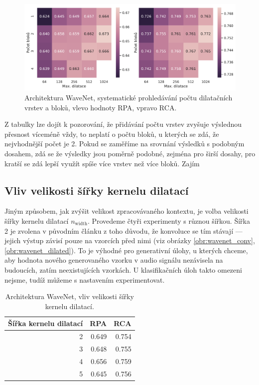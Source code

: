 \begin{figure}[h]\centering
    \includegraphics[scale=0.5]{../img/figures/wavenet_stacks_gridsearch.pdf}
\caption{Architektura WaveNet, systematické prohledávání počtu dilatačních vrstev a bloků, vlevo hodnoty RPA, vpravo RCA.}\label{obr:wavenet_stacks_gridsearch}
\end{figure}

Z tabulky lze dojít k pozorování, že přidávání počtu vrstev zvyšuje výslednou přesnost víceméně vždy, to neplatí o počtu bloků, u kterých se zdá, že nejvhodnější počet je 2. Pokud se zaměříme na srovnání výsledků s podobným dosahem, zdá se že výsledky jsou poměrně podobné, zejména pro širší dosahy, pro kratší se zdá lepší využít spíše více vrstev než více bloků. Zajím

\subsection{Vliv velikosti šířky kernelu dilatací}

Jiným způsobem, jak zvýšit velikost zpracovávaného kontextu, je volba velikosti šířky kernelu dilatací $n_{\mathrm{width}}$. Provedeme čtyři experimenty s různou šířkou. Šířka 2 je zvolena v původním článku z toho důvodu, že konvoluce se tím stávají  --- jejich výstup závisí pouze na vzorcích před nimi (viz obrázky \ref{obr:wavenet_conv}, \ref{obr:wavenet_dilated}). To je výhodné pro generativní úlohy, u kterých chceme, aby hodnota nového generovaného vzorku v audio signálu nezávisela na budoucích, zatím neexistujících vzorkách. U klasifikačních úloh takto omezeni nejsme, tudíž můžeme s nastavením experimentovat. 

\begin{table}[h!]
\centering
    \begin{tabular}{rrr}
    \toprule
    Šířka kernelu dilatací &   RPA &   RCA \\
    \midrule
                        2 & 0.649 & 0.754 \\
                        3 & 0.648 & 0.755 \\
                        4 & 0.656 & 0.759 \\
                        5 & 0.645 & 0.756 \\
    \bottomrule
    \end{tabular}
\caption{Architektura WaveNet, vliv velikosti šířky kernelu dilatací.}\label{tab:wavenet_dilation_width}
\end{table}

